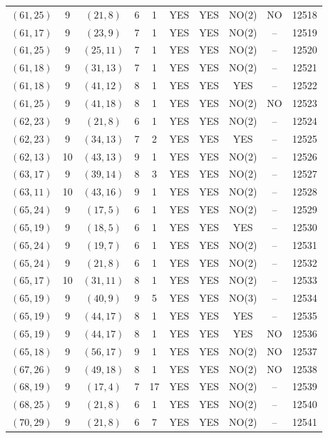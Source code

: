 \begin{longtable}{|c|c|c|c|c|c|c|c|c|c|}
$(61, 25)$ & 9 & $(21, 8)$ & 6 & 1 & YES & YES & NO(2) & NO & 12518\\
$(61, 17)$ & 9 & $(23, 9)$ & 7 & 1 & YES & YES & NO(2) & -- & 12519\\
$(61, 25)$ & 9 & $(25, 11)$ & 7 & 1 & YES & YES & NO(2) & -- & 12520\\
$(61, 18)$ & 9 & $(31, 13)$ & 7 & 1 & YES & YES & NO(2) & -- & 12521\\
$(61, 18)$ & 9 & $(41, 12)$ & 8 & 1 & YES & YES & YES & -- & 12522\\
$(61, 25)$ & 9 & $(41, 18)$ & 8 & 1 & YES & YES & NO(2) & NO & 12523\\
$(62, 23)$ & 9 & $(21, 8)$ & 6 & 1 & YES & YES & NO(2) & -- & 12524\\
$(62, 23)$ & 9 & $(34, 13)$ & 7 & 2 & YES & YES & YES & -- & 12525\\
$(62, 13)$ & 10 & $(43, 13)$ & 9 & 1 & YES & YES & NO(2) & -- & 12526\\
$(63, 17)$ & 9 & $(39, 14)$ & 8 & 3 & YES & YES & NO(2) & -- & 12527\\
$(63, 11)$ & 10 & $(43, 16)$ & 9 & 1 & YES & YES & NO(2) & -- & 12528\\
$(65, 24)$ & 9 & $(17, 5)$ & 6 & 1 & YES & YES & NO(2) & -- & 12529\\
$(65, 19)$ & 9 & $(18, 5)$ & 6 & 1 & YES & YES & YES & -- & 12530\\
$(65, 24)$ & 9 & $(19, 7)$ & 6 & 1 & YES & YES & NO(2) & -- & 12531\\
$(65, 24)$ & 9 & $(21, 8)$ & 6 & 1 & YES & YES & NO(2) & -- & 12532\\
$(65, 17)$ & 10 & $(31, 11)$ & 8 & 1 & YES & YES & NO(2) & -- & 12533\\
$(65, 19)$ & 9 & $(40, 9)$ & 9 & 5 & YES & YES & NO(3) & -- & 12534\\
$(65, 19)$ & 9 & $(44, 17)$ & 8 & 1 & YES & YES & YES & -- & 12535\\
$(65, 19)$ & 9 & $(44, 17)$ & 8 & 1 & YES & YES & YES & NO & 12536\\
$(65, 18)$ & 9 & $(56, 17)$ & 9 & 1 & YES & YES & NO(2) & NO & 12537\\
$(67, 26)$ & 9 & $(49, 18)$ & 8 & 1 & YES & YES & NO(2) & NO & 12538\\
$(68, 19)$ & 9 & $(17, 4)$ & 7 & 17 & YES & YES & NO(2) & -- & 12539\\
$(68, 25)$ & 9 & $(21, 8)$ & 6 & 1 & YES & YES & NO(2) & -- & 12540\\
$(70, 29)$ & 9 & $(21, 8)$ & 6 & 7 & YES & YES & NO(2) & -- & 12541\\

\end{longtable}
